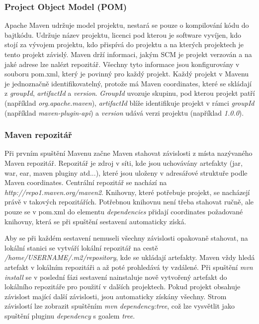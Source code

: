\documentclass[11pt,twoside,a4paper]{book}
\begin{document}
\subsubsection{Project Object Model (POM)}

Apache Maven udržuje model projektu, nestará se pouze o kompilování kódu do bajtkódu.
Udržuje název projektu, licenci pod kterou je software vyvíjen, kdo stojí za vývojem projektu,
kdo přispívá do projektu a na kterých projektech je tento projekt závislý. Maven drží
informaci, jakým SCM je projekt verzován a na jaké adrese lze nalézt repozitář. Všechny tyto
informace jsou konfigurovány v souboru pom.xml, který je povinný pro každý projekt. Každý
projekt v Mavenu je jednoznačně identifikovatelný, protože má Maven coordinates, které se
skládají z {\em groupId}, {\em artifactId} a {\em version}. 
{\em GroupId} uvozuje skupinu, pod kterou projekt patří (například
{\em org.apache.maven}), {\em artifactId} blíže identifikuje projekt v rámci
{\em groupId} (například {\em maven-plugin-api}) a {\em version} udává verzi projektu
(například {\em 1.0.0}).

\subsubsection{Maven repozitář}

Při prvním spuštění Mavenu začne Maven stahovat závislosti z místa nazývaného Maven
repozitář. Repozitář je zdroj v síti, kde jsou uchovávány artefakty (jar, war,
ear, maven pluginy atd...), které jsou uloženy v adresářové struktuře podle Maven coordinates. Centrální
repozitář se nachází na {\em http://repo1.maven.org/maven2}. Knihovny, které
potřebuje projekt, se nacházejí právě v takových repozitářích. Potřebnou knihovnu není třeba
stahovat ručně, ale pouze se v pom.xml do elementu {\em dependencies} přidají
coordinates požadované knihovny, která se při spuštění sestavení automaticky získá.

Aby se při každém sestavení nemuseli všechny závislosti opakovaně stahovat, na
lokální stanici se vytváří lokální repozitář na cestě {\em
/home/USERNAME/.m2/repository}, kde se ukládají artefakty. Maven vždy hledá
artefakt v lokálním repozitáři a až poté prohledává ty vzdálené. Při spuštění
{\em mvn install} se v poslední fázi sestavení nainstaluje nově vytvořený
artefakt do lokálního repozitáře pro použití v dalších projektech. Pokud projekt obsahuje
závislost mající další závislosti, jsou automaticky získány všechny. Strom
závislostí lze zobrazit spuštěním {\em mvn dependency:tree}, což lze
vysvětlit jako spuštění pluginu {\em dependency} s goalem {\em tree}.
\end{document}
